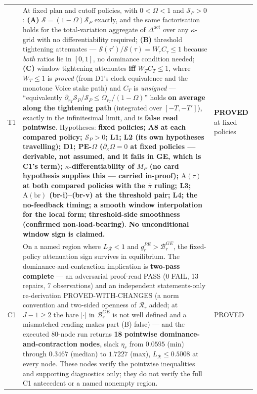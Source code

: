 \documentclass[11pt,a4paper]{article}
\newcommand{\Dact}{\Delta^{\mathrm{act}}}
\newcommand{\Atau}{\mathrm{A}(\tau)}
\newcommand{\Abr}{\mathrm{A}(\mathrm{br})}
\begin{document}
\begin{longtable}{@{}p{}>{\raggedright\arraybackslash}p{}>{\raggedright\arraybackslash}p{}@{}}
T1 &
At fixed plan and cutoff policies, with $0<\Omega<1$ and $\mathcal S_P>0$:
\textbf{(A)} $\mathcal S=(1-\Omega)\mathcal S_P$ exactly, and the same factorisation
holds for the total-variation aggregate of $\Dact$ over any $\kappa$-grid with no
differentiability required; \textbf{(B)} threshold tightening attenuates ---
$\mathcal S(\tau')/\mathcal S(\tau)=W_\tau C_\tau\le1$ because \emph{both} ratios lie
in $[0,1]$, no dominance condition needed; \textbf{(C)} window tightening attenuates
\textbf{iff} $W_TC_T\le1$, where $W_T\le1$ is \emph{proved} (from D1's clock
equivalence and the monotone Voice stake path) and $C_T$ is \emph{unsigned} ---
``equivalently $\partial_{r_T}\mathcal S_P/\mathcal S_P\le\Omega_{r_T}/(1-\Omega)$''
holds \textbf{on average along the tightening path} (integrated over $[-T,-T']$),
exactly in the infinitesimal limit, and is \textbf{false read pointwise}.
Hypotheses: \textbf{fixed policies; A8 at each compared policy;
$\mathcal S_P>0$; L1; L2 (its own hypotheses travelling); D1; PE-$\Omega$
($\partial_\kappa\Omega=0$ at fixed policies --- derivable, not assumed, and it fails
in GE, which is C1's term); $\kappa$-differentiability of $M_P$ (no card hypothesis
supplies this --- carried in-proof); $\Atau$ at both compared policies with the
$\bar\pi$ ruling; L3; $\Abr$ (br-i)--(br-v) at the threshold pair; L4; the
no-feedback timing; a smooth window interpolation for the local form; threshold-side
smoothness (confirmed non-load-bearing)}. \textbf{No unconditional window sign is
claimed.} &
\textbf{PROVED} at fixed policies \\
\addlinespace

C1 &
On a named region where $L_{\mathcal R}<1$ and $g_r^{PE}>\mathcal B_r^{GE}$, the
fixed-policy attenuation sign survives in equilibrium. The dominance-and-contraction
implication is \textbf{two-pass complete} --- an adversarial proof-read PASS (0 FAIL,
13 repairs, 7 observations) and an independent statements-only re-derivation
PROVED-WITH-CHANGES (a norm convention and two-sided openness of $\mathcal R_r$
added; at $J-1\ge2$ the bare $|\cdot|$ in $\mathcal B_r^{GE}$ is not well defined and
a mismatched reading makes part (B) false) --- and the executed 80-node run returns
\textbf{18 pointwise dominance-and-contraction nodes}, slack $\eta_r$ from $0.0595$
(min) through $0.3467$ (median) to $1.7227$ (max), $L_{\mathcal R}\le0.5008$ at every
node. These nodes verify the pointwise inequalities and supporting diagnostics only;
they do not verify the full C1 antecedent or a named nonempty region. &
PROVED\\
\end{longtable}
\endgroup
\end{document}
